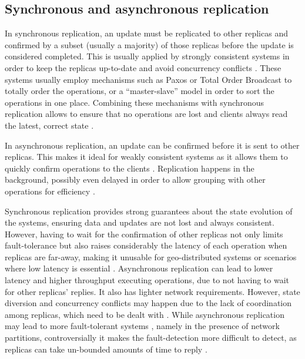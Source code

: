 \subsection{Synchronous and asynchronous replication}
\label{subsec:syncAsync}


In synchronous replication, an update must be replicated to other replicas and confirmed by a subset (usually a majority) of those replicas before the update is considered completed.
This is usually applied by strongly consistent systems in order to keep the replicas up-to-date and avoid concurrency conflicts \cite{dynamo, spanner}.
These systems usually employ mechanisms such as Paxos \cite{paxos} or Total Order Broadcast \cite{tob} to totally order the operations, or a ``master-slave'' model in order to sort the operations in one place.
Combining these mechanisms with synchronous replication allows to ensure that no operations are lost and clients always read the latest, correct state \cite{spanner}.


In asynchronous replication, an update can be confirmed before it is sent to other replicas.
This makes it ideal for weakly consistent systems as it allows them to quickly confirm operations to the clients \cite{cops}.
Replication happens in the background, possibly even delayed in order to allow grouping with other operations for efficiency \cite{dynamo, cure}.

Synchronous replication provides strong guarantees about the state evolution of the systems, ensuring data and updates are not lost and always consistent.
However, having to wait for the confirmation of other replicas not only limits fault-tolerance \cite{spanner} but also raises considerably the latency of each operation when replicas are far-away, making it unusable for geo-distributed systems or scenarios where low latency is essential \cite{slog}.
Asynchronous replication can lead to lower latency and higher throughput executing operations, due to not having to wait for other replicas' replies.
It also has lighter network requirements.
However, state diversion and concurrency conflicts may happen due to the lack of coordination among replicas, which need to be dealt with \cite{dynamo}.
While asynchronous replication may lead to more fault-tolerant systems \cite{dynamo, cassandra, cops}, namely in the presence of network partitions, controversially it makes the fault-detection more difficult to detect, as replicas can take un-bounded amounts of time to reply \cite{cap}.


